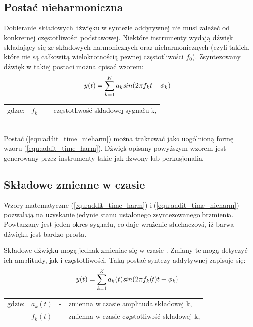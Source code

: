 \subsection{Postać nieharmoniczna} \label{pos_nieharm}
Dobieranie składowych dźwięku w syntezie addytywnej nie musi zależeć od konkretnej częstotliwości podstawowej. Niektóre instrumenty wydają dźwięk składający się ze składowych harmonicznych oraz nieharmonicznych (czyli takich, które nie są całkowitą wielokrotnością pewnej częstotliwości $f_{0}$). Zsyntezowany dźwięk w takiej postaci można opisać wzorem:
\begin{equation} \label{equ:addit_time_nieharm}
y(t) = \sum_{k=1}^{K} a_{k}sin(2\pi f_{k}t + \phi_{k})  \\  
\end{equation}
\begin{tabular}{ l l l l}
	gdzie: 	&	$f_{k}$ & - &  częstotliwość składowej sygnału k,\\
\end{tabular} \\

Postać (\ref{equ:addit_time_nieharm}) można traktować jako uogólnioną formę wzoru (\ref{equ:addit_time_harm}). Dźwięk opisany powyższym wzorem jest generowany przez instrumenty takie jak dzwony lub perkusjonalia.

\subsection{Składowe zmienne w czasie}
Wzory matematyczne (\ref{equ:addit_time_harm}) i (\ref{equ:addit_time_nieharm}) pozwalają na uzyskanie jedynie stanu ustalonego zsyntezowanego brzmienia. Powtarzany jest jeden okres sygnału, co daje wrażenie słuchaczowi, iż barwa dźwięku jest bardzo prosta.

Składowe dźwięku mogą jednak zmieniać się w czasie \cite{add_time_varying}. Zmiany te mogą dotyczyć ich amplitudy, jak i częstotliwości.
Taką postać syntezy addytywnej zapisuje się:
\begin{equation} \label{equ:addit_time_zmienne}
y(t) = \sum_{k=1}^{K} a_{k}(t)sin(2\pi f_{k}(t)t + \phi_{k})  \\  
\end{equation}
\begin{tabular}{ l l l l}
	gdzie: & $a_{k}(t)$ &  - & zmienna w czasie amplituda składowej k, \\
	&	$f_{k}(t)$ & - &  zmienna w czasie częstotliwość składowej k, \\
\end{tabular} \\

